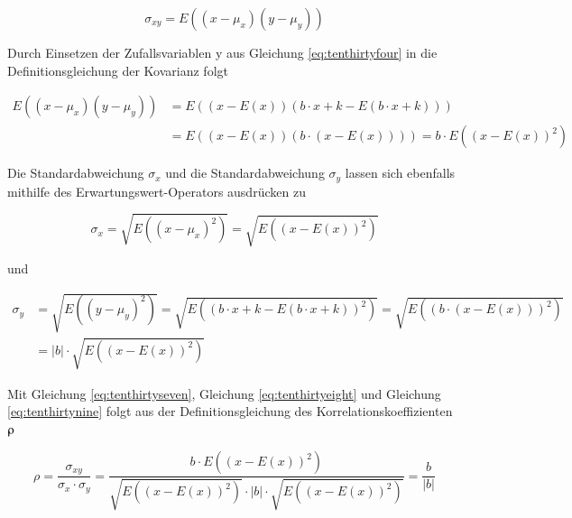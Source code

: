 \begin{equation}\label{eq:tenthirtysix}
\sigma _{xy} =E\left((x-\mu _{x})(y-\mu _{y})\right)
\end{equation}

\noindent Durch Einsetzen der Zufallsvariablen y aus Gleichung \eqref{eq:tenthirtyfour} in die Definitionsgleichung der Kovarianz folgt

\begin{equation}\label{eq:tenthirtyseven}
\begin{split}
E\left((x-\mu _{x})(y-\mu _{y})\right)& =E\left((x-E(x))\left(b\cdot x+k-E(b\cdot x+k)\right)\right)\\ 
& = E\left((x-E(x))\left(b\cdot (x-E(x))\right)\right)=b\cdot E\left((x-E(x))^{2} \right)
\end{split}
\end{equation}

\noindent Die Standardabweichung $\sigma_{x}$ und die Standardabweichung $\sigma_{y}$ lassen sich ebenfalls mithilfe des Erwartungswert-Operators ausdr\"{u}cken zu

\begin{equation}\label{eq:tenthirtyeight}
\sigma _{x} =\sqrt{E\left((x-\mu _{x})^{2} \right)} =\sqrt{E\left((x-E(x))^{2} \right)}
\end{equation}

\noindent und

\begin{equation}\label{eq:tenthirtynine}
\begin{split}
\sigma _{y} & =\sqrt{E\left((y-\mu _{y})^{2} \right)} =\sqrt{E\left(\left(b\cdot x+k-E(b\cdot x+k)\right)^{2} \right)} =\sqrt{E\left(\left(b\cdot (x-E(x))\right)^{2} \right)} \\
& = \left | b \right|\cdot\sqrt{E\left((x-E(x))^{2} \right)}
\end{split}
\end{equation}

\noindent Mit Gleichung \eqref{eq:tenthirtyseven}, Gleichung \eqref{eq:tenthirtyeight} und Gleichung \eqref{eq:tenthirtynine} folgt aus der Definitionsgleichung des Korrelationskoeffizienten $\rhoup$ 

\begin{equation}\label{eq:tenfourty}
\rho =\dfrac{\sigma _{xy}}{\sigma _{x} \cdot \sigma _{y}} =\dfrac{b\cdot E\left((x-E(x))^{2} \right)}{\sqrt{E\left((x-E(x))^{2} \right)} \cdot \left|b\right|\cdot \sqrt{E\left((x-E(x))^{2} \right)}} =\dfrac{b}{\left|b\right|}
\end{equation}


